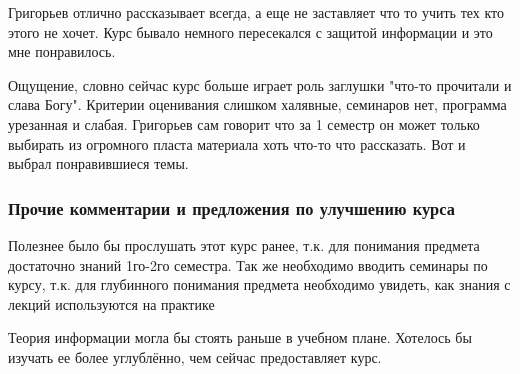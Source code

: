             \begin{commentbox} 
                Григорьев отлично рассказывает всегда, а еще не заставляет что то учить тех кто этого не хочет. Курс бывало немного пересекался с защитой информации и это мне понравилось. 
            \end{commentbox} 
        
            \begin{commentbox} 
                Ощущение, словно сейчас курс больше играет роль заглушки "что-то прочитали и слава Богу". Критерии  оценивания слишком халявные, семинаров нет, программа урезанная и слабая. Григорьев сам говорит что за 1 семестр он может только выбирать из огромного пласта материала хоть что-то что рассказать. Вот и выбрал понравившиеся темы. 
            \end{commentbox}     
    
    
    \subsubsection{Прочие комментарии и предложения по улучшению курса}
        \begin{commentbox}
            Полезнее было бы прослушать этот курс ранее, т.к. для понимания предмета достаточно знаний 1го-2го семестра. Так же необходимо вводить семинары по курсу, т.к. для глубинного понимания предмета необходимо увидеть, как знания с лекций используются на практике
        \end{commentbox}

        \begin{commentbox}
            Теория информации могла бы стоять раньше в учебном плане. Хотелось бы изучать ее более углублённо, чем сейчас предоставляет курс. 
        \end{commentbox}